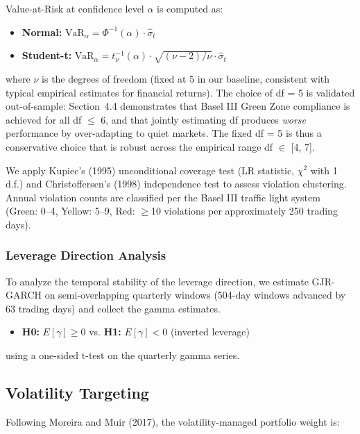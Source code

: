 Value-at-Risk at confidence level $\alpha$ is computed as:
\begin{itemize}
\item \textbf{Normal:} $\text{VaR}_\alpha = \Phi^{-1}(\alpha) \cdot \hat{\sigma}_t$
\item \textbf{Student-t:} $\text{VaR}_\alpha = t^{-1}_\nu(\alpha) \cdot \sqrt{(\nu-2)/\nu} \cdot \hat{\sigma}_t$

\end{itemize}
where $\nu$ is the degrees of freedom (fixed at 5 in our baseline, consistent with typical empirical estimates for financial returns). The choice of df = 5 is validated out-of-sample: Section~4.4 demonstrates that Basel III Green Zone compliance is achieved for all df $\leq$ 6, and that jointly estimating df produces \textit{worse} performance by over-adapting to quiet markets. The fixed df = 5 is thus a conservative choice that is robust across the empirical range df $\in$ [4, 7].

We apply Kupiec's (1995) unconditional coverage test (LR statistic, $\chi^{2}$ with 1 d.f.) and Christoffersen's (1998) independence test to assess violation clustering. Annual violation counts are classified per the Basel III traffic light system (Green: 0--4, Yellow: 5--9, Red: $\geq$10 violations per approximately 250 trading days).

\subsubsection{Leverage Direction Analysis}

To analyze the temporal stability of the leverage direction, we estimate GJR-GARCH on semi-overlapping quarterly windows (504-day windows advanced by 63 trading days) and collect the gamma estimates. %
\begin{itemize}
\item \textbf{H0:} $E[\gamma] \geq 0$ vs. \textbf{H1:} $E[\gamma] < 0$ (inverted leverage)
\end{itemize}
using a one-sided t-test on the quarterly gamma series.

\subsection{Volatility Targeting}

Following Moreira and Muir (2017), the volatility-managed portfolio weight is:

